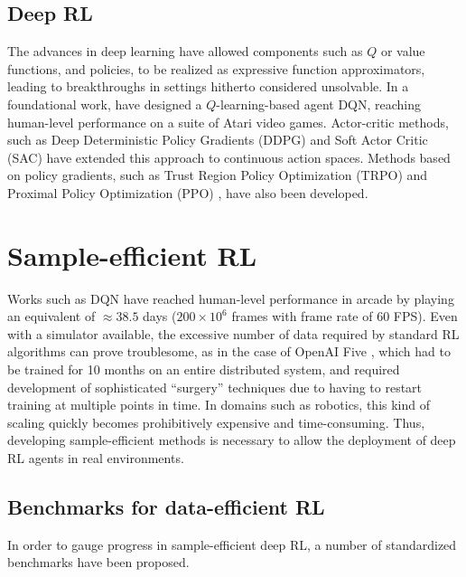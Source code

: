 \documentclass[en]{pracamgr}
\begin{document}
\subsection{Deep RL}

The advances in deep learning have allowed components such as $Q$ or value functions, and policies, to be realized as expressive function approximators, leading to breakthroughs in settings hitherto considered unsolvable. In a foundational work, \autocite{mnihHumanlevelControlDeep2015} have designed a $Q$-learning-based agent DQN, reaching human-level performance on a suite of Atari video games. Actor-critic methods, such as Deep Deterministic Policy Gradients (DDPG) \autocite{lillicrapContinuousControlDeep2019} and Soft Actor Critic (SAC) \autocite{haarnojaSoftActorCriticOffPolicy2018} have extended this approach to continuous action spaces. Methods based on policy gradients, such as Trust Region Policy Optimization (TRPO) \autocite{schulmanTrustRegionPolicy2017} and Proximal Policy Optimization (PPO) \autocite{schulmanProximalPolicyOptimization2017}, have also been developed.

\section{Sample-efficient RL}

Works such as DQN have reached human-level performance in arcade by playing an equivalent of $\approx 38.5$ days ($200 \times 10^6$ frames with frame rate of $60$ FPS). Even with a simulator available, the excessive number of data required by standard RL algorithms can prove troublesome, as in the case of OpenAI Five \autocite{openaiDota2Large2019}, which had to be trained for 10 months on an entire distributed system, and required development of sophisticated ``surgery'' techniques due to having to restart training at multiple points in time. In domains such as robotics, this kind of scaling quickly becomes prohibitively expensive and time-consuming. Thus, developing sample-efficient methods is necessary to allow the deployment of deep RL agents in real environments.

\subsection{Benchmarks for data-efficient RL}

In order to gauge progress in sample-efficient deep RL, a number of standardized benchmarks have been proposed.
\end{document}
